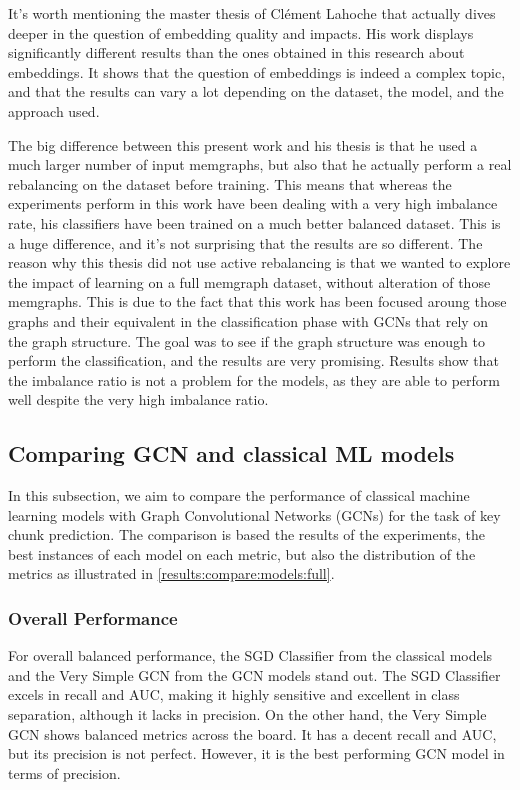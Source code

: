 It's worth mentioning the master thesis of Clément Lahoche that actually dives deeper in the question of embedding quality and impacts. His work displays significantly different results than the ones obtained in this research about embeddings. It shows that the question of embeddings is indeed a complex topic, and that the results can vary a lot depending on the dataset, the model, and the approach used.

The big difference between this present work and his thesis is that he used a much larger number of input memgraphs, but also that he actually perform a real rebalancing on the dataset before training. This means that whereas the experiments perform in this work have been dealing with a very high imbalance rate, his classifiers have been trained on a much better balanced dataset. This is a huge difference, and it's not surprising that the results are so different. The reason why this thesis did not use active rebalancing is that we wanted to explore the impact of learning on a full memgraph dataset, without alteration of those memgraphs. This is due to the fact that this work has been focused aroung those graphs and their equivalent in the classification phase with GCNs that rely on the graph structure. The goal was to see if the graph structure was enough to perform the classification, and the results are very promising. Results show that the imbalance ratio is not a problem for the models, as they are able to perform well despite the very high imbalance ratio.

\subsection{Comparing GCN and classical ML models}

In this subsection, we aim to compare the performance of classical machine learning models with Graph Convolutional Networks (GCNs) for the task of key chunk prediction. The comparison is based the results of the experiments, the best instances of each model on each metric, but also the distribution of the metrics as illustrated in \ref{results:compare:models:full}.

\subsubsection{Overall Performance}

For overall balanced performance, the SGD Classifier from the classical models and the Very Simple GCN from the GCN models stand out. The SGD Classifier excels in recall and AUC, making it highly sensitive and excellent in class separation, although it lacks in precision. On the other hand, the Very Simple GCN shows balanced metrics across the board. It has a decent recall and AUC, but its precision is not perfect. However, it is the best performing GCN model in terms of precision.

